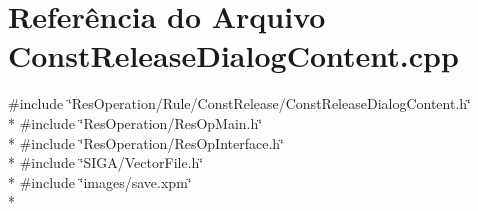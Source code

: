 \section{Referência do Arquivo Const\+Release\+Dialog\+Content.\+cpp}
\label{_rule_2_const_release_2_const_release_dialog_content_8cpp}
{\ttfamily \#include \char`\"{}Res\+Operation/\+Rule/\+Const\+Release/\+Const\+Release\+Dialog\+Content.\+h\char`\"{}}\\*
{\ttfamily \#include \char`\"{}Res\+Operation/\+Res\+Op\+Main.\+h\char`\"{}}\\*
{\ttfamily \#include \char`\"{}Res\+Operation/\+Res\+Op\+Interface.\+h\char`\"{}}\\*
{\ttfamily \#include \char`\"{}S\+I\+G\+A/\+Vector\+File.\+h\char`\"{}}\\*
{\ttfamily \#include \char`\"{}images/save.\+xpm\char`\"{}}\\*
